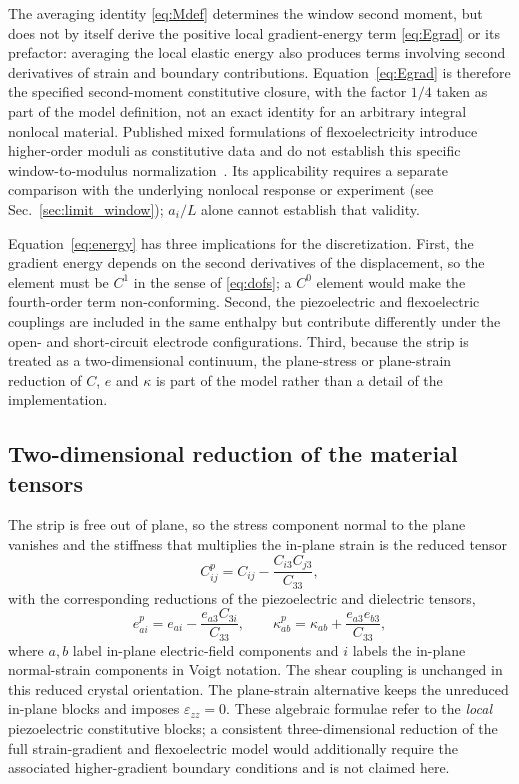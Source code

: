 The averaging identity \eqref{eq:Mdef} determines the window second moment,
but does not by itself derive the positive local gradient-energy term
\eqref{eq:Egrad} or its prefactor: averaging the local elastic energy also
produces terms involving second derivatives of strain and boundary
contributions. Equation~\eqref{eq:Egrad} is therefore the specified
second-moment constitutive closure, with the factor $1/4$ taken as part of
the model definition, not an exact identity for an arbitrary integral
nonlocal material. Published mixed formulations of flexoelectricity
introduce higher-order moduli as constitutive data and do not establish
this specific window-to-modulus normalization~\cite{MaoPurohitAravas2016,SerraoKozinov2024}.
Its applicability requires a separate comparison with
the underlying nonlocal response or experiment (see Sec.~\ref{sec:limit_window}); $a_i/L$ alone cannot establish that validity.

Equation~\eqref{eq:energy} has three implications for the discretization.
First, the
gradient energy depends on the second derivatives of the displacement, so the element
must be $C^1$ in the sense of \eqref{eq:dofs}; a $C^0$ element would make the
fourth-order term non-conforming. Second, the piezoelectric and flexoelectric
couplings are included in the same enthalpy but contribute differently under the
open- and short-circuit electrode configurations.
Third, because the strip is treated as a two-dimensional continuum, the
plane-stress or plane-strain reduction of $C$, $e$ and $\kappa$ is part of the
model rather than a detail of the implementation.

\FloatBarrier
\subsection{Two-dimensional reduction of the material tensors}
\label{sec:reduction}

The strip is free out of plane, so the stress component normal to the plane
vanishes and the stiffness that multiplies the in-plane strain is the reduced
tensor
\begin{equation}
  C^{p}_{ij} = C_{ij} - \frac{C_{i3}C_{j3}}{C_{33}},
  \label{eq:Cp}
\end{equation}
with the corresponding reductions of the piezoelectric and dielectric tensors,
\begin{equation}
  e^{p}_{ai} = e_{ai} - \frac{e_{a3}C_{3i}}{C_{33}},
  \qquad
  \kappa^{p}_{ab} = \kappa_{ab} + \frac{e_{a3}e_{b3}}{C_{33}},
  \label{eq:ep}
\end{equation}
where $a,b$ label in-plane electric-field components and $i$ labels the
in-plane normal-strain components in Voigt notation. The shear coupling is
unchanged in this reduced crystal orientation. The plane-strain alternative
keeps the unreduced in-plane blocks and imposes
$\varepsilon_{zz}=0$. These algebraic formulae refer to the \emph{local}
piezoelectric constitutive blocks; a consistent three-dimensional reduction
of the full strain-gradient and flexoelectric model would additionally require
the associated higher-gradient boundary conditions and is not claimed here.

